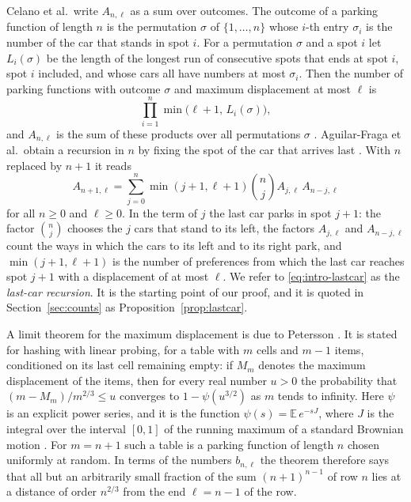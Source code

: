 \documentclass{amsart}
\theoremstyle{definition}
\theoremstyle{remark}
\numberwithin{equation}{section}
\begin{document}
Celano et al.\ write $A_{n,\ell}$ as a sum over outcomes. The outcome of a
parking function of length $n$ is the permutation $\sigma$ of
$\{1,\dots,n\}$ whose $i$-th entry $\sigma_i$ is the number of the car that
stands in spot $i$. For a permutation $\sigma$ and a spot $i$ let
$L_i(\sigma)$ be the length of the longest run of consecutive spots that ends
at spot $i$, spot $i$ included, and whose cars all have numbers at most
$\sigma_i$. Then the number of parking functions with outcome $\sigma$ and
maximum displacement at most $\ell$ is
\[
\prod_{i=1}^{n}\min\bigl(\ell+1,\,L_i(\sigma)\bigr),
\]
and $A_{n,\ell}$ is the sum of these products over all permutations $\sigma$
\cite[Section~4.1, (6)--(8)]{celano2025}. Aguilar-Fraga et al.\ obtain a
recursion in $n$ by fixing the spot of the car that arrives last
\cite[Theorem~3.7]{aguilarfraga2024}. With $n$ replaced by $n+1$ it reads
\begin{equation}\label{eq:intro-lastcar}
A_{n+1,\ell}=\sum_{j=0}^{n}\min(j+1,\ell+1)\binom{n}{j}A_{j,\ell}\,A_{n-j,\ell}
\end{equation}
for all $n\ge0$ and $\ell\ge0$. In the term of $j$ the last car parks in spot
$j+1$: the factor $\binom nj$ chooses the $j$ cars that stand to its left,
the factors $A_{j,\ell}$ and $A_{n-j,\ell}$ count the ways in which the cars
to its left and to its right park, and $\min(j+1,\ell+1)$ is the number of
preferences from which the last car reaches spot $j+1$ with a displacement of
at most $\ell$. We refer to \eqref{eq:intro-lastcar} as the \emph{last-car
recursion}. It is the starting point of our proof, and it is quoted in
Section~\ref{sec:counts} as Proposition~\ref{prop:lastcar}.

A limit theorem for the maximum displacement is due to Petersson
\cite[Theorem~2.1]{petersson2009}. It is stated for hashing with linear
probing, for a table with $m$ cells and $m-1$ items, conditioned on
its last cell remaining empty: if $M_m$ denotes the maximum displacement of
the items, then for every real number $u>0$ the probability that
$(m-M_m)/m^{2/3}\le u$ converges to $1-\psi(u^{3/2})$ as $m$ tends to
infinity. Here $\psi$ is an explicit power series, and it is the function
$\psi(s)=\mathbb{E}\,e^{-sJ}$, where $J$ is the integral over the interval
$[0,1]$ of the running maximum of a standard Brownian motion
\cite[Corollary~2.4]{jansonpetersson2009}. For $m=n+1$ such a table is a
parking function of length $n$ chosen uniformly at random. In terms of the
numbers $b_{n,\ell}$ the theorem therefore says that all but an arbitrarily
small fraction of the sum $(n+1)^{n-1}$ of row $n$ lies at a distance of
order $n^{2/3}$ from the end $\ell=n-1$ of the row.
\end{document}
